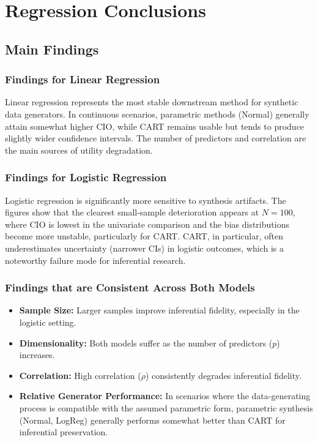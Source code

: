 \chapter{Regression Conclusions}
\label{chap:regression-conclusions}

\section{Main Findings}
\label{sec:reg-main-findings}

\subsection{Findings for Linear Regression}
Linear regression represents the most stable downstream method for synthetic data generators. In continuous scenarios, parametric methods (Normal) generally attain somewhat higher CIO, while CART remains usable but tends to produce slightly wider confidence intervals. The number of predictors and correlation are the main sources of utility degradation.

\subsection{Findings for Logistic Regression}
Logistic regression is significantly more sensitive to synthesis artifacts. The figures show that the clearest small-sample deterioration appears at $N=100$, where CIO is lowest in the univariate comparison and the bias distributions become more unstable, particularly for CART. CART, in particular, often underestimates uncertainty (narrower CIs) in logistic outcomes, which is a noteworthy failure mode for inferential research.

\subsection{Findings that are Consistent Across Both Models}
\begin{itemize}
    \item \textbf{Sample Size:} Larger samples improve inferential fidelity, especially in the logistic setting.
    \item \textbf{Dimensionality:} Both models suffer as the number of predictors ($p$) increases.
    \item \textbf{Correlation:} High correlation ($\rho$) consistently degrades inferential fidelity.
    \item \textbf{Relative Generator Performance:} In scenarios where the data-generating process is compatible with the assumed parametric form, parametric synthesis (Normal, LogReg) generally performs somewhat better than CART for inferential preservation.
\end{itemize}

